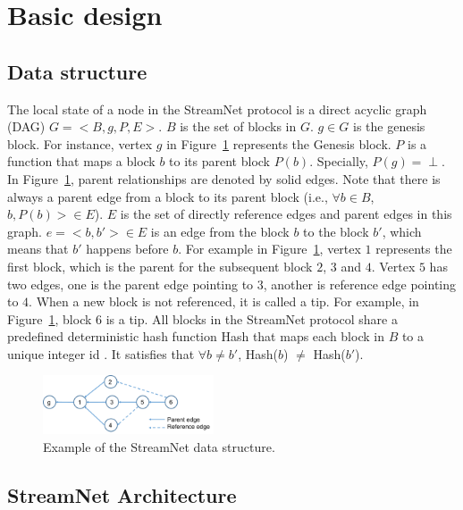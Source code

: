 \section{Basic design}


\subsection{Data structure}

The local state of a node in the StreamNet protocol is a direct acyclic graph (DAG) $G = <B,g,P,E>$. 
$B$ is the set of blocks in $G$. 
$g \in G$ is the genesis block. 
For instance, vertex $g$ in Figure~\ref{simple_sn} represents the Genesis block.
$P$ is a function that maps a block $b$ to its parent block $P(b)$. Specially, $P(g) = \perp$. 
In Figure~\ref{simple_sn}, parent relationships are denoted by solid edges.
Note that there is always a parent edge from a block to its parent block (i.e., $\forall b \in B$, $b, P(b)> \in E$). 
$E$ is the set of directly reference edges and parent edges in this graph. 
$e = <b,b'> \in E$ is an edge from the block $b$ to the block $b'$, 
which means that $b'$ happens before $b$. 
For example in Figure~\ref{simple_sn}, vertex $1$ represents the first block, which is the parent for the subsequent block $2$, $3$ and $4$. 
Vertex $5$ has two edges, one is the parent edge pointing to $3$, another is reference edge pointing to $4$.
When a new block is not referenced, it is called a tip. For example, in Figure~\ref{simple_sn}, block $6$ is a tip.
All blocks in the StreamNet protocol share a predefined deterministic 
hash function Hash that maps each block in $B$ to a unique integer id . 
It satisfies that $\forall {b} \neq {b'}$, Hash($b$) $\neq$ Hash($b'$).

\begin{figure}[!ht]
\begin{center}
\includegraphics[width=0.45\textwidth]{figures/simple_sn.pdf}
    \caption{
        Example of the StreamNet data structure.
     }
\label{simple_sn}
\end{center}
\end{figure}

\subsection{StreamNet Architecture}


